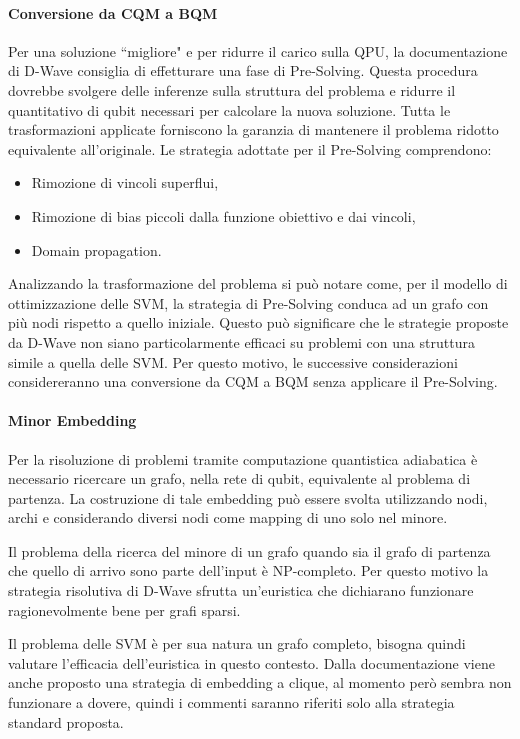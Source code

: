\documentclass[12pt]{article}
\begin{document}
\paragraph{Conversione da CQM a BQM}

Per una soluzione “migliore" e per ridurre il carico sulla QPU, la documentazione di D-Wave consiglia di effetturare una fase di Pre-Solving.
Questa procedura dovrebbe svolgere delle inferenze sulla struttura del problema e ridurre il quantitativo di qubit necessari per calcolare la nuova soluzione.
Tutta le trasformazioni applicate forniscono la garanzia di mantenere il problema ridotto equivalente all'originale.
Le strategia adottate per il Pre-Solving comprendono:
\begin{itemize}
  \item Rimozione di vincoli superflui,
  \item Rimozione di bias piccoli dalla funzione obiettivo e dai vincoli,
  \item Domain propagation.
\end{itemize}

Analizzando la trasformazione del problema si può notare come, per il modello di ottimizzazione delle SVM, la strategia di Pre-Solving conduca ad un grafo con più nodi rispetto a quello iniziale.
Questo può significare che le strategie proposte da D-Wave non siano particolarmente efficaci su problemi con una struttura simile a quella delle SVM.
Per questo motivo, le successive considerazioni considereranno una conversione da CQM a BQM senza applicare il Pre-Solving.

\paragraph{Minor Embedding}

Per la risoluzione di problemi tramite computazione quantistica adiabatica è necessario ricercare un grafo, nella rete di qubit, equivalente al problema di partenza.
La costruzione di tale embedding può essere svolta utilizzando nodi, archi e considerando diversi nodi come mapping di uno solo nel minore.

Il problema della ricerca del minore di un grafo quando sia il grafo di partenza che quello di arrivo sono parte dell'input è NP-completo.
Per questo motivo la strategia risolutiva di D-Wave sfrutta un'euristica che dichiarano funzionare ragionevolmente bene per grafi sparsi.

Il problema delle SVM è per sua natura un grafo completo, bisogna quindi valutare l'efficacia dell'euristica in questo contesto.
Dalla documentazione viene anche proposto una strategia di embedding a clique, al momento però sembra non funzionare a dovere, quindi i commenti saranno riferiti solo alla strategia standard proposta.
\end{document}
